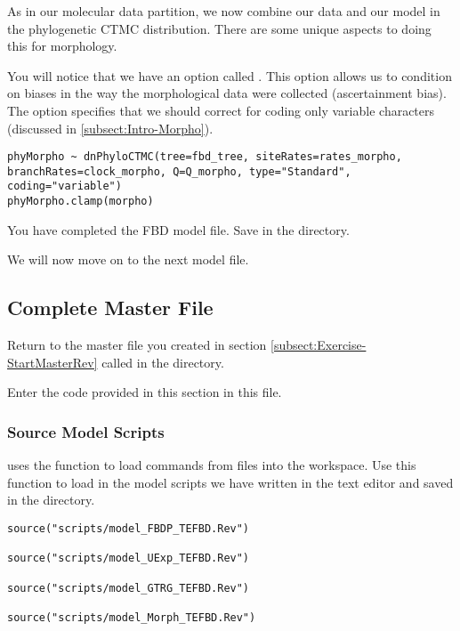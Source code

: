 As in our molecular data partition, we now combine our data and our model in the phylogenetic CTMC distribution. 
There are some unique aspects to doing this for morphology. 

You will notice that we have an option called . This option allows us to condition on biases in the way the morphological data were collected (ascertainment bias).
The option  specifies that we should correct for coding only variable characters (discussed in \ref{subsect:Intro-Morpho}). \par

{\tt \begin{snugshade*}
\begin{lstlisting}
phyMorpho ~ dnPhyloCTMC(tree=fbd_tree, siteRates=rates_morpho, branchRates=clock_morpho, Q=Q_morpho, type="Standard", coding="variable")
phyMorpho.clamp(morpho)
\end{lstlisting}
\end{snugshade*}}

{\begin{framed}
You have completed the FBD model file. Save  in the  directory.

We will now move on to the next model file.
\end{framed}}

\bigskip

\subsection{Complete Master \Rev File}\label{subsect:Exercise-CompleteMCMC}

{\begin{framed}
Return to the master \Rev file you created in section \ref{subsect:Exercise-StartMasterRev} called {\textcolor{red}{}} in the  directory.

Enter the \Rev code provided in this section in this file.
\end{framed}}

\medskip
\subsubsection{Source Model Scripts}\label{subsub:Exercise-SourceMods}

\RevBayes uses the  function to load commands from \Rev files into the workspace.
Use this function to load in the model scripts we have written in the text editor and saved in the  directory.
{\tt \begin{snugshade*}
\begin{lstlisting}
source("scripts/model_FBDP_TEFBD.Rev")

source("scripts/model_UExp_TEFBD.Rev")

source("scripts/model_GTRG_TEFBD.Rev")

source("scripts/model_Morph_TEFBD.Rev")
\end{lstlisting}
\end{snugshade*}}



